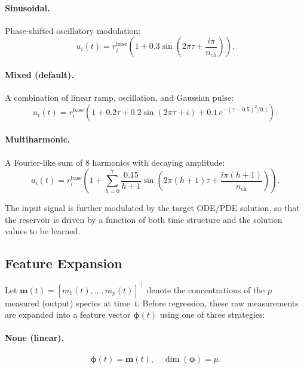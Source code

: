 \documentclass[11pt,twocolumn]{article}
\newcommand{\bphi}{\boldsymbol{\phi}}
\begin{document}
\paragraph{Sinusoidal.}
Phase-shifted oscillatory modulation:
\begin{equation}
  u_i(t) = r_i^\text{base}\left(1 + 0.3\sin\!\left(2\pi\tau + \frac{i\pi}{n_\text{ch}}\right)\right).
\end{equation}

\paragraph{Mixed (default).}
A combination of linear ramp, oscillation, and Gaussian pulse:
\begin{equation}
  u_i(t) = r_i^\text{base}\!\left(1 + 0.2\tau + 0.2\sin(2\pi\tau + i) + 0.1\,e^{-(\tau-0.5)^2/0.1}\right).
  \label{eq:mixed}
\end{equation}

\paragraph{Multiharmonic.}
A Fourier-like sum of 8 harmonics with decaying amplitude:
\begin{equation}
  u_i(t) = r_i^\text{base}\!\left(1 + \sum_{h=0}^{7} \frac{0.15}{h+1}\sin\!\left(2\pi(h{+}1)\tau + \frac{i\pi(h{+}1)}{n_\text{ch}}\right)\right).
\end{equation}

The input signal is further modulated by the target ODE/PDE solution, so that
the reservoir is driven by a function of both time structure and the solution
values to be learned.

\subsection{Feature Expansion}
\label{sec:features}

Let $\mathbf{m}(t) = [m_1(t), \ldots, m_p(t)]^\top$ denote the
concentrations of the $p$ measured (output) species at time~$t$.  Before
regression, these raw measurements are expanded into a feature vector
$\bphi(t)$ using one of three strategies:

\paragraph{None (linear).}
\begin{equation}
  \bphi(t) = \mathbf{m}(t), \quad \dim(\bphi) = p.
\end{equation}
\end{document}

